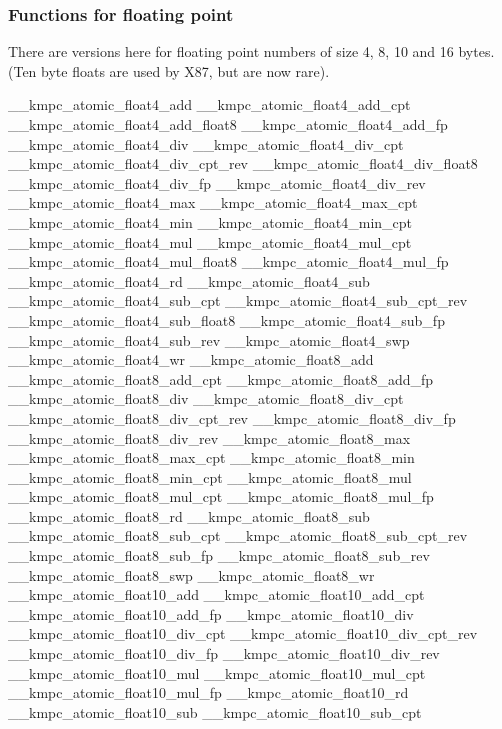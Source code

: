 \subsubsection*{Functions for floating point }

There are versions here for floating point numbers of size 4, 8, 10 and 16 bytes. (Ten byte floats are used by X87, but are now rare). 
\begin{DoxyCode}
\_\_kmpc\_atomic\_float4\_add
\_\_kmpc\_atomic\_float4\_add\_cpt
\_\_kmpc\_atomic\_float4\_add\_float8
\_\_kmpc\_atomic\_float4\_add\_fp
\_\_kmpc\_atomic\_float4\_div
\_\_kmpc\_atomic\_float4\_div\_cpt
\_\_kmpc\_atomic\_float4\_div\_cpt\_rev
\_\_kmpc\_atomic\_float4\_div\_float8
\_\_kmpc\_atomic\_float4\_div\_fp
\_\_kmpc\_atomic\_float4\_div\_rev
\_\_kmpc\_atomic\_float4\_max
\_\_kmpc\_atomic\_float4\_max\_cpt
\_\_kmpc\_atomic\_float4\_min
\_\_kmpc\_atomic\_float4\_min\_cpt
\_\_kmpc\_atomic\_float4\_mul
\_\_kmpc\_atomic\_float4\_mul\_cpt
\_\_kmpc\_atomic\_float4\_mul\_float8
\_\_kmpc\_atomic\_float4\_mul\_fp
\_\_kmpc\_atomic\_float4\_rd
\_\_kmpc\_atomic\_float4\_sub
\_\_kmpc\_atomic\_float4\_sub\_cpt
\_\_kmpc\_atomic\_float4\_sub\_cpt\_rev
\_\_kmpc\_atomic\_float4\_sub\_float8
\_\_kmpc\_atomic\_float4\_sub\_fp
\_\_kmpc\_atomic\_float4\_sub\_rev
\_\_kmpc\_atomic\_float4\_swp
\_\_kmpc\_atomic\_float4\_wr
\_\_kmpc\_atomic\_float8\_add
\_\_kmpc\_atomic\_float8\_add\_cpt
\_\_kmpc\_atomic\_float8\_add\_fp
\_\_kmpc\_atomic\_float8\_div
\_\_kmpc\_atomic\_float8\_div\_cpt
\_\_kmpc\_atomic\_float8\_div\_cpt\_rev
\_\_kmpc\_atomic\_float8\_div\_fp
\_\_kmpc\_atomic\_float8\_div\_rev
\_\_kmpc\_atomic\_float8\_max
\_\_kmpc\_atomic\_float8\_max\_cpt
\_\_kmpc\_atomic\_float8\_min
\_\_kmpc\_atomic\_float8\_min\_cpt
\_\_kmpc\_atomic\_float8\_mul
\_\_kmpc\_atomic\_float8\_mul\_cpt
\_\_kmpc\_atomic\_float8\_mul\_fp
\_\_kmpc\_atomic\_float8\_rd
\_\_kmpc\_atomic\_float8\_sub
\_\_kmpc\_atomic\_float8\_sub\_cpt
\_\_kmpc\_atomic\_float8\_sub\_cpt\_rev
\_\_kmpc\_atomic\_float8\_sub\_fp
\_\_kmpc\_atomic\_float8\_sub\_rev
\_\_kmpc\_atomic\_float8\_swp
\_\_kmpc\_atomic\_float8\_wr
\_\_kmpc\_atomic\_float10\_add
\_\_kmpc\_atomic\_float10\_add\_cpt
\_\_kmpc\_atomic\_float10\_add\_fp
\_\_kmpc\_atomic\_float10\_div
\_\_kmpc\_atomic\_float10\_div\_cpt
\_\_kmpc\_atomic\_float10\_div\_cpt\_rev
\_\_kmpc\_atomic\_float10\_div\_fp
\_\_kmpc\_atomic\_float10\_div\_rev
\_\_kmpc\_atomic\_float10\_mul
\_\_kmpc\_atomic\_float10\_mul\_cpt
\_\_kmpc\_atomic\_float10\_mul\_fp
\_\_kmpc\_atomic\_float10\_rd
\_\_kmpc\_atomic\_float10\_sub
\_\_kmpc\_atomic\_float10\_sub\_cpt

\end{DoxyCode}
